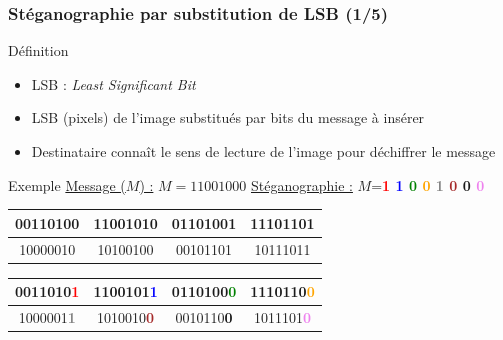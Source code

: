 \documentclass{beamer}
\begin{document}
	\begin{frame}
	\frametitle{Stéganographie par substitution de LSB (1/5)}
	\begin{alertblock}{Définition}
   	\rightskip=0pt\leftskip=0pt
	\begin{itemize}
	 	\item LSB : \textit{Least Significant Bit}
	 	\item LSB (pixels) de l'image substitués par bits du message à insérer
	 	\item Destinataire connaît le sens de lecture de l'image pour déchiffrer le message
	\end{itemize}
	\end{alertblock}

 
	\begin{exampleblock}{Exemple}
   	\rightskip=0pt\leftskip=0pt
   		{\small
			\underline{Message ($M$) :} $M = 11001000$ \hfill \underline{Stéganographie :} $M$=\textbf{\textcolor{red}{1}
						  \textcolor{blue}{1}
						  \textcolor{green}{0}
						  \textcolor{orange}{0}
						  \textcolor{gray}{1}
						  \textcolor{Brown}{0}
						  \textcolor{RubineRed}{0}
						  \textcolor{Violet}{0}}
		}
		
		{\tiny
		\begin{minipage}{.5\textwidth}\centering
			\begin{tabular}{|c|c|c|c|}
			\hline
			00110100 & 11001010 & 01101001 & 11101101 \\\hline
			10000010 & 10100100 & 00101101 & 10111011 \\\hline
			\end{tabular}
		\end{minipage}
		\begin{minipage}{.5\textwidth}\centering
			\begin{tabular}{|c|c|c|c|}
			\hline
			0011010\textcolor{red}{\textbf{1}} & 1100101\textcolor{blue}{\textbf{1}} & 0110100\textcolor{green}{\textbf{0}} & 1110110\textcolor{orange}{\textbf{0}} \\\hline
			1000001\textcolor{gray}{\textbf{1}} & 1010010\textcolor{Brown}{\textbf{0}} & 0010110\textcolor{RubineRed}{\textbf{0}} & 1011101\textcolor{Violet}{\textbf{0}} \\\hline
			\end{tabular}
			\end{minipage}
		}
	\end{exampleblock}
	\end{frame}
	
\end{document}

